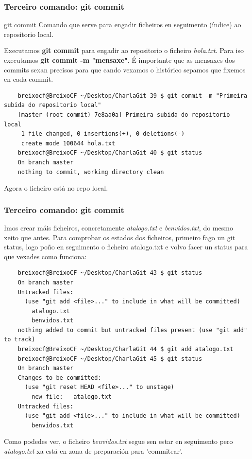 \begin{frame}[fragile]
  \frametitle{Terceiro comando: git commit}
  \begin{block}{git commit}
    Comando que serve para engadir ficheiros en seguimento (índice) ao repositorio local.
  \end{block}
  \small
  Executamos \textbf{git commit} para engadir ao repositorio o ficheiro \textit{hola.txt}. Para iso executamos \textbf{git commit -m "mensaxe"}. É importante que as mensaxes dos commits sexan precisos para que cando vexamos o histórico sepamos que fixemos en cada commit.
  \tiny 
\begin{verbatim}
	breixocf@BreixoCF ~/Desktop/CharlaGit 39 $ git commit -m "Primeira subida do repositorio local"
	[master (root-commit) 7e8aa0a] Primeira subida do repositorio local
	 1 file changed, 0 insertions(+), 0 deletions(-)
	 create mode 100644 hola.txt
	breixocf@BreixoCF ~/Desktop/CharlaGit 40 $ git status
	On branch master
	nothing to commit, working directory clean
\end{verbatim}
  \small
  Agora o ficheiro está no repo local.
\end{frame}

\begin{frame}[fragile]
  \frametitle{Terceiro comando: git commit}
  \scriptsize
  Imos crear máis ficheiros, concretamente \textit{atalogo.txt} e \textit{benvidos.txt}, do mesmo xeito que antes.
  Para comprobar os estados dos ficheiros, primeiro fago un git status, logo poño en seguimento o ficheiro atalogo.txt e volvo facer un status para que vexades como funciona:
  \tiny 
\begin{verbatim}
	breixocf@BreixoCF ~/Desktop/CharlaGit 43 $ git status
	On branch master
	Untracked files:
	  (use "git add <file>..." to include in what will be committed)
		atalogo.txt
		benvidos.txt
	nothing added to commit but untracked files present (use "git add" to track)
	breixocf@BreixoCF ~/Desktop/CharlaGit 44 $ git add atalogo.txt 
	breixocf@BreixoCF ~/Desktop/CharlaGit 45 $ git status
	On branch master
	Changes to be committed:
	  (use "git reset HEAD <file>..." to unstage)
		new file:   atalogo.txt
	Untracked files:
	  (use "git add <file>..." to include in what will be committed)
		benvidos.txt
\end{verbatim}
  \scriptsize
  Como podedes ver, o ficheiro \textit{benvidos.txt} segue sen estar en seguimento pero \textit{atalogo.txt} xa está en zona de preparación para 'commitear'. 
\end{frame}

